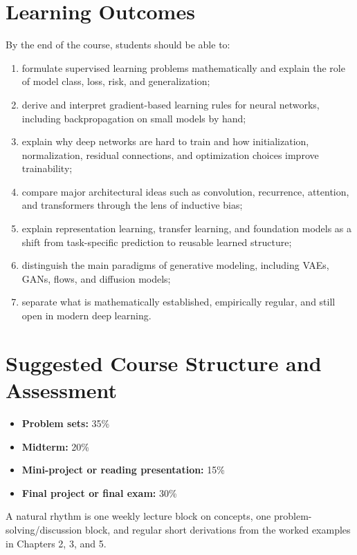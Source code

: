 \documentclass[11pt]{article}
\begin{document}
\section{Learning Outcomes}
By the end of the course, students should be able to:
\begin{enumerate}
  \item formulate supervised learning problems mathematically and explain the role of model class, loss, risk, and generalization;
  \item derive and interpret gradient-based learning rules for neural networks, including backpropagation on small models by hand;
  \item explain why deep networks are hard to train and how initialization, normalization, residual connections, and optimization choices improve trainability;
  \item compare major architectural ideas such as convolution, recurrence, attention, and transformers through the lens of inductive bias;
  \item explain representation learning, transfer learning, and foundation models as a shift from task-specific prediction to reusable learned structure;
  \item distinguish the main paradigms of generative modeling, including VAEs, GANs, flows, and diffusion models;
  \item separate what is mathematically established, empirically regular, and still open in modern deep learning.
\end{enumerate}

\section{Suggested Course Structure and Assessment}
\begin{itemize}
  \item \textbf{Problem sets:} 35\% 
  \item \textbf{Midterm:} 20\%
  \item \textbf{Mini-project or reading presentation:} 15\%
  \item \textbf{Final project or final exam:} 30\%
\end{itemize}

\noindent A natural rhythm is one weekly lecture block on concepts, one problem-solving/discussion block, and regular short derivations from the worked examples in Chapters 2, 3, and 5.
\end{document}
